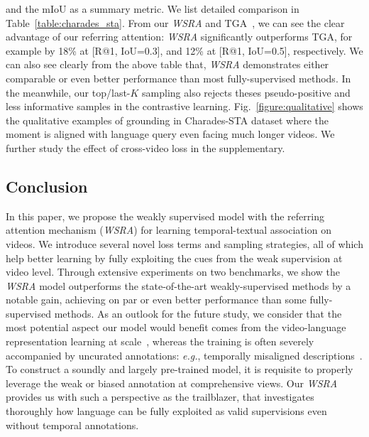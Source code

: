 and the mIoU as a summary metric.
We list detailed comparison in Table~\ref{table:charades_sta}.
From our \textit{WSRA} and TGA~\citep{Mithun_2019_CVPR}, 
we can see the clear advantage of our referring attention:  
\textit{WSRA} significantly outperforms TGA, 
for example by 18\% at [R@1, IoU=0.3], 
and 12\% at [R@1, IoU=0.5], respectively. 
We can also see clearly from the above table that, 
\textit{WSRA} demonstrates either comparable or even better performance than 
most fully-supervised methods. 
In the meanwhile, our top/last-$K$ sampling also rejects theses pseudo-positive and less informative samples in the contrastive learning. Fig.~\ref{figure:qualitative} shows the qualitative examples of grounding in Charades-STA dataset where the moment is aligned with language query even facing much longer videos. We further study the effect of cross-video loss in the supplementary.
\subsection{Conclusion}
In this paper, we propose the weakly supervised model with the referring attention mechanism (\textit{WSRA})  for learning temporal-textual association on videos.
We introduce several novel loss terms and sampling strategies,
all of which help better learning by fully exploiting the cues from 
the weak supervision at video level.
Through extensive experiments on two benchmarks,
we show the \textit{WSRA} model outperforms the state-of-the-art weakly-supervised
methods by a notable gain,
achieving on par or even better performance than some fully-supervised methods. As an outlook for the future study, we consider that the most potential aspect our model would benefit comes from the video-language representation learning at scale~\citep{miech2019howto100m}, whereas the training is often severely accompanied by uncurated annotations: \textit{e.g.}, temporally misaligned descriptions~\citep{miech2019end}. To construct a soundly and largely pre-trained model, it is requisite to properly leverage the weak or biased annotation at comprehensive views. Our \textit{WSRA} provides us with such a perspective as the trailblazer, that investigates thoroughly how language can be fully exploited as valid supervisions even without temporal annotations.
